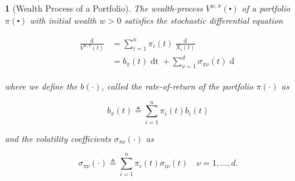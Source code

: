 \documentclass[british]{amsart} \usepackage{lmodern}
\numberwithin{equation}{section} \numberwithin{figure}{section}
\theoremstyle{plain} \newtheorem{thm}{\protect\theoremname}[section]
\theoremstyle{definition} \newtheorem{defn}[thm]{\protect\definitionname}
\theoremstyle{plain} \newtheorem{assumption}[thm]{\protect\assumptionname}
\theoremstyle{plain} \newtheorem{lem}[thm]{\protect\lemmaname}
\theoremstyle{plain} \newtheorem{prop}[thm]{\protect\propositionname}
\theoremstyle{remark} \newtheorem{rem}[thm]{\protect\remarkname}
\theoremstyle{plain} \newtheorem{cor}[thm]{\protect\corollaryname}
\renewcommand{\d}[1]{\mathop{\mathrm{d}{#1}}}
\newcommand{\defeq}{\mathop{\triangleq}} \newcommand{\almostsurely}{\text{a.s.}}
\begin{document}
\begin{prop} [Wealth Process of a Portfolio]

  The wealth-process $V^{w,\pi}(\centerdot)$ of a portfolio $\pi(\centerdot)$
  with initial wealth $w > 0$ satisfies the stochastic differential equation

  \begin{gather}
    \label{eq:wealthprocess}
    \begin{split}
      \frac{\d{V^{w,\pi}(t)}}{V^{w,\pi}(t)} 
        &= \sum_{i=1}^{n} \pi_{i}(t) \frac{\d{X_{i}(t)}}{X_{i}(t)} \\
        &= b_{\pi}(t)\d{t} + \sum_{\nu=1}^{d} \sigma_{\pi\nu}(t) \d{W_{\nu}(t)}
    \end{split}
  \end{gather}

  where we define the $b(\cdot)$, called the \textit{rate-of-return} of the 
  portfolio $\pi(\cdot)$ as

  \begin{equation*}
    \label{eq:bpi}
    b_{\pi}(t) \defeq \sum_{i=1}^{n} \pi_{i}(t) b_{i}(t)
  \end{equation*}

  and the volatility coefficients $\sigma_{\pi\nu}(\cdot)$ as

  \begin{equation*}
    \label{eq:sigmapi}
    \sigma_{\pi\nu}(\cdot) \defeq \sum_{i=1}^{n} \pi_{i}(t) \sigma_{i\nu}(t)
    \quad \nu=1,\dots,d.
  \end{equation*}

\end{prop}
\end{document}
